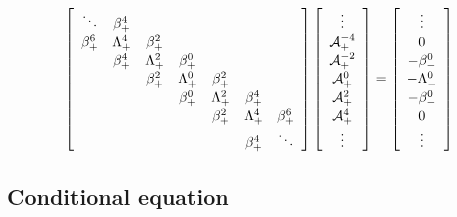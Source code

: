 \begin{equation}
	\arraycolsep = 5pt \def\arraystretch{1.1}
	\left[
	\begin{array}{ccccccc}
		\ddots    &  \beta_+^4  &               &               &               &               &             \\
		\beta_+^6 & \Lambda_+^4 &  \beta_+^2  &               &               &               &             \\
		&  \beta_+^4  & \Lambda_+^2 &  \beta_+^0  &               &               &             \\
		&               &  \beta_+^2  & \Lambda_+^0 &  \beta_+^2  &               &             \\
		&               &               &  \beta_+^0  & \Lambda_+^2 &  \beta_+^4  &             \\
		&               &               &               &  \beta_+^2  & \Lambda_+^4 & \beta_+^6 \\
		&               &               &               &               &  \beta_+^4  &   \ddots
	\end{array} 
	\right]
	\left[
	\begin{array}{c}
		\vdots \\
		\mathcal{A}_{+}^{-4} \\
		\mathcal{A}_{+}^{-2} \\
		\mathcal{A}_{+}^{0} \\
		\mathcal{A}_{+}^{2} \\
		\mathcal{A}_{+}^{4} \\
		\vdots
	\end{array} 
	\right]
	=
	\left[
	\begin{array}{c}
		\vdots \\
		0 \\
		-\beta_-^0 \\
		-\Lambda_-^0 \\
		-\beta_-^0 \\
		0 \\
		\vdots
	\end{array} 
	\right]
	\label{eq:matrix_eigenvalue_equation}
\end{equation}

\subsection*{Conditional equation}

